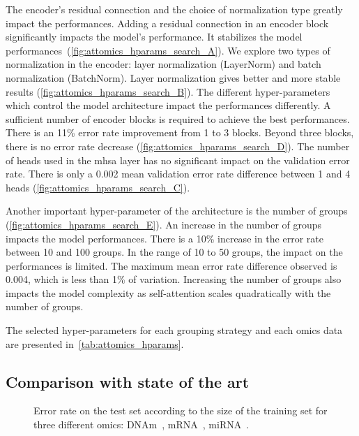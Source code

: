 \documentclass[../main.tex]{subfiles}
\begin{document}
		The encoder's residual connection and the choice of normalization type greatly impact the performances.
		Adding a residual connection in an encoder block significantly impacts the model's performance.
		It stabilizes the model performances~(\cref{fig:attomics_hparams_search_A}).
		We explore two types of normalization in the encoder: layer normalization (LayerNorm) and batch normalization (BatchNorm).
		Layer normalization gives better and more stable results (\cref{fig:attomics_hparams_search_B}).
		The different hyper-parameters which control the model architecture impact the performances differently.
		A sufficient number of encoder blocks is required to achieve the best performances.
		There is an 11\% error rate improvement from 1 to 3 blocks.
		Beyond three blocks, there is no error rate decrease (\cref{fig:attomics_hparams_search_D}).
		The number of heads used in the \gls{mhsa} layer has no significant impact on the validation error rate.
		There is only a 0.002 mean validation error rate difference between 1 and 4 heads (\cref{fig:attomics_hparams_search_C}).

		Another important hyper-parameter of the architecture is the number of groups (\cref{fig:attomics_hparams_search_E}).
		An increase in the number of groups impacts the model performances.
		There is a 10\% increase in the error rate between 10 and 100 groups.
		In the range of 10 to 50 groups, the impact on the performances is limited.
		The maximum mean error rate difference observed is 0.004, which is less than 1\% of variation.
		Increasing the number of groups also impacts the model complexity as self-attention scales quadratically with the number of groups.

		The selected hyper-parameters for each grouping strategy and each omics data are presented in~\cref{tab:attomics_hparams}.

	\subsection{Comparison with state of the art}

		\begin{figure}[htbp]
			\centering
			\begin{subcaptiongroup}
				\ifSubfilesClassLoaded{%
				}{
				}
				\label{fig:limit_train_classif_A}
				\label{fig:limit_train_classif_B}
				\label{fig:limit_train_classif_C}
			\end{subcaptiongroup}
			\caption{Error rate on the test set according to the size of the training set for three different omics: DNAm~, mRNA~, miRNA~.}\label{fig:limit_train_classif}
		\end{figure}
\end{document}

